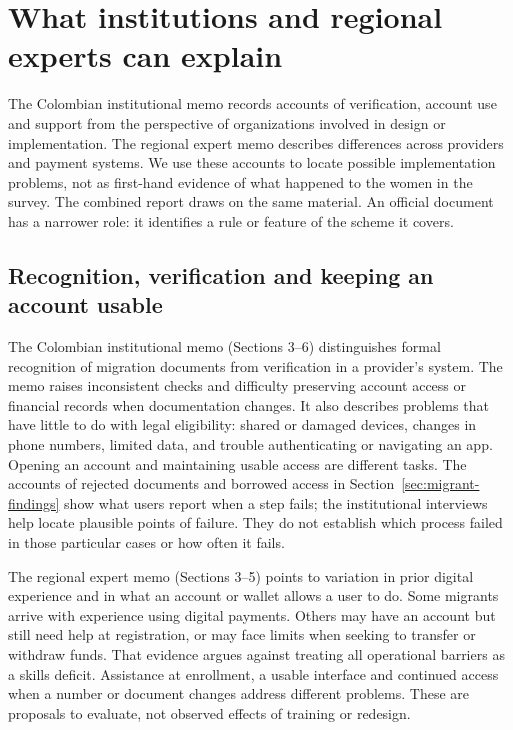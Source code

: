 \section{What institutions and regional experts can explain}
\label{sec:expert-findings}
The Colombian institutional memo records accounts of verification, account use and support from the perspective of organizations involved in design or implementation. The regional expert memo describes differences across providers and payment systems. We use these accounts to locate possible implementation problems, not as first-hand evidence of what happened to the women in the survey. The combined report draws on the same material. An official document has a narrower role: it identifies a rule or feature of the scheme it covers.

\subsection{Recognition, verification and keeping an account usable}

The Colombian institutional memo (Sections 3--6) distinguishes formal recognition of migration documents from verification in a provider's system. The memo raises inconsistent checks and difficulty preserving account access or financial records when documentation changes. It also describes problems that have little to do with legal eligibility: shared or damaged devices, changes in phone numbers, limited data, and trouble authenticating or navigating an app. Opening an account and maintaining usable access are different tasks. The accounts of rejected documents and borrowed access in Section~\ref{sec:migrant-findings} show what users report when a step fails; the institutional interviews help locate plausible points of failure. They do not establish which process failed in those particular cases or how often it fails.

The regional expert memo (Sections 3--5) points to variation in prior digital experience and in what an account or wallet allows a user to do. Some migrants arrive with experience using digital payments. Others may have an account but still need help at registration, or may face limits when seeking to transfer or withdraw funds. That evidence argues against treating all operational barriers as a skills deficit. Assistance at enrollment, a usable interface and continued access when a number or document changes address different problems. These are proposals to evaluate, not observed effects of training or redesign.

